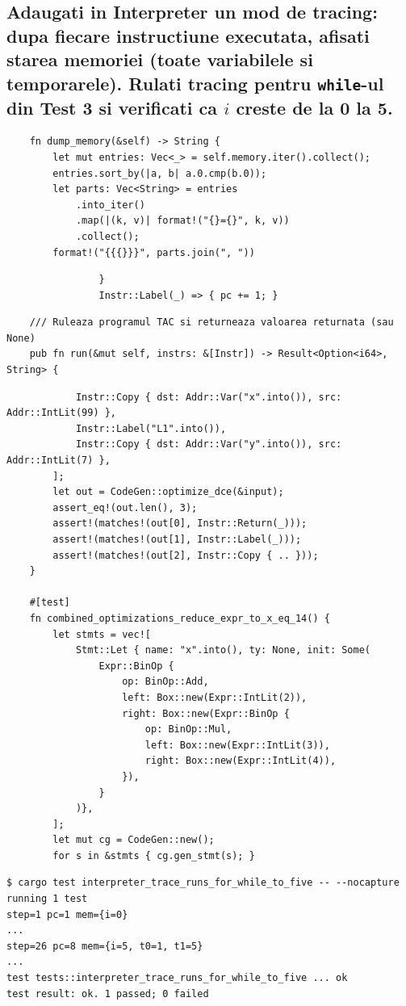 \documentclass[11pt]{article}
\begin{document}
\subsection{Adaugati in Interpreter un mod de tracing: dupa fiecare instructiune executata, afisati starea memoriei (toate variabilele si temporarele). Rulati tracing pentru \texttt{while}-ul din Test 3 si verificati ca \(i\) creste de la 0 la 5.}
\label{sec:orgc7fb639}
\begin{verbatim}
    fn dump_memory(&self) -> String {
        let mut entries: Vec<_> = self.memory.iter().collect();
        entries.sort_by(|a, b| a.0.cmp(b.0));
        let parts: Vec<String> = entries
            .into_iter()
            .map(|(k, v)| format!("{}={}", k, v))
            .collect();
        format!("{{{}}}", parts.join(", "))
\end{verbatim}
\begin{verbatim}
                }
                Instr::Label(_) => { pc += 1; }
\end{verbatim}
\begin{verbatim}
    /// Ruleaza programul TAC si returneaza valoarea returnata (sau None)
    pub fn run(&mut self, instrs: &[Instr]) -> Result<Option<i64>, String> {
\end{verbatim}
\begin{verbatim}
            Instr::Copy { dst: Addr::Var("x".into()), src: Addr::IntLit(99) },
            Instr::Label("L1".into()),
            Instr::Copy { dst: Addr::Var("y".into()), src: Addr::IntLit(7) },
        ];
        let out = CodeGen::optimize_dce(&input);
        assert_eq!(out.len(), 3);
        assert!(matches!(out[0], Instr::Return(_)));
        assert!(matches!(out[1], Instr::Label(_)));
        assert!(matches!(out[2], Instr::Copy { .. }));
    }

    #[test]
    fn combined_optimizations_reduce_expr_to_x_eq_14() {
        let stmts = vec![
            Stmt::Let { name: "x".into(), ty: None, init: Some(
                Expr::BinOp {
                    op: BinOp::Add,
                    left: Box::new(Expr::IntLit(2)),
                    right: Box::new(Expr::BinOp {
                        op: BinOp::Mul,
                        left: Box::new(Expr::IntLit(3)),
                        right: Box::new(Expr::IntLit(4)),
                    }),
                }
            )},
        ];
        let mut cg = CodeGen::new();
        for s in &stmts { cg.gen_stmt(s); }
\end{verbatim}
\begin{verbatim}
$ cargo test interpreter_trace_runs_for_while_to_five -- --nocapture
running 1 test
step=1 pc=1 mem={i=0}
...
step=26 pc=8 mem={i=5, t0=1, t1=5}
...
test tests::interpreter_trace_runs_for_while_to_five ... ok
test result: ok. 1 passed; 0 failed
\end{verbatim}
\end{document}

